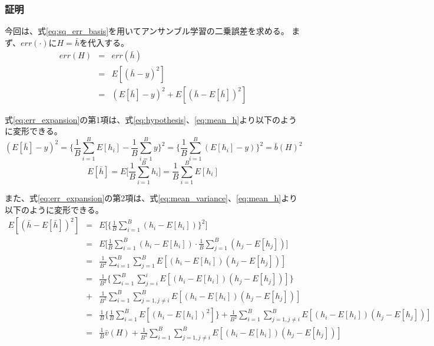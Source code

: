 \documentclass{jsarticle}
\begin{document}
\subsubsection{証明}
今回は、式\ref{eq:sq_err_basis}を用いてアンサンブル学習の二乗誤差を求める。
まず、$err(\cdot)$に$H=\bar{h}$を代入する。
\begin{eqnarray}
    err(H) &=& err(\bar{h}) \nonumber \\
    &=& E[(\bar{h}-y)^2] \nonumber \\
    \label{eq:err_expansion}
    &=& (E[\bar{h}]-y)^2+E[(\bar{h}-E[\bar{h}])^2]
\end{eqnarray}

式\ref{eq:err_expansion}の第1項は、式\ref{eq:hypothesis}、\ref{eq:mean_h}より以下のように変形できる。
\begin{equation}
    (E[\bar{h}]-y)^2 = \Biggl\{\frac{1}{B}\sum_{i=1}^B{E[h_i]-\frac{1}{B}\sum_{i=1}^B{y}}\Biggr\}^2 = \Biggl\{\frac{1}{B}\sum_{i=1}^B{(E[h_i]-y)} \Biggr\}^2 = \bar{b}(H)^2
    \label{eq:ensemble_bias}
\end{equation}
\begin{equation}
    E[\bar{h}]=E\Biggl[\frac{1}{B}\sum_{i=1}^B{h_i}\Biggr]=\frac{1}{B}\sum_{i=1}^B{E[h_i]}
    \label{eq:mean_h}
\end{equation}

また、式\ref{eq:err_expansion}の第2項は、式\ref{eq:mean_variance}、\ref{eq:mean_h}より以下のように変形できる。
\begin{eqnarray}
    E[(\bar{h}-E[\bar{h}])^2] &=& E\Biggl[\Biggl\{\frac{1}{B}\sum_{i=1}^B{(h_i-E[h_i])}\Biggr\}^2\Biggr] \nonumber \\
    &=& E\Biggl[\frac{1}{B}\sum_{i=1}^B{(h_i-E[h_i])}\cdot\frac{1}{B}\sum_{j=1}^B{(h_j-E[h_j])}\Biggr] \nonumber \\
    &=& \frac{1}{B^2}\sum_{i=1}^B\sum_{j=1}^B{E[(h_i-E[h_i])(h_j-E[h_j])]} \nonumber \\
    &=& \frac{1}{B^2}\Biggl\{\sum_{i=1}^B\sum_{j=i}^i{E[(h_i-E[h_i])(h_j-E[h_j])]}\Biggr\} \nonumber \\
    &+& \frac{1}{B^2}\sum_{i=1}^B\sum_{j=1,j\neq i}^B{E[(h_i-E[h_i])(h_j-E[h_j])]} \nonumber \\
    &=& \frac{1}{B}\Biggl\{\frac{1}{B}\sum_{i=1}^B{E[(h_i-E[h_i])^2]}\Biggr\}\!+\!\frac{1}{B^2}\sum_{i=1}^B\sum_{j=1,j\neq i}^B{E[(h_i-E[h_i])(h_j-E[h_j])]} \nonumber \\
    \label{eq:2nd_expansion}
    &=& \frac{1}{B}\bar{v}(H)+\frac{1}{B^2}\sum_{i=1}^B\sum_{j=1,j\neq i}^B{E[(h_i-E[h_i])(h_j-E[h_j])]}
\end{eqnarray}
\end{document}
